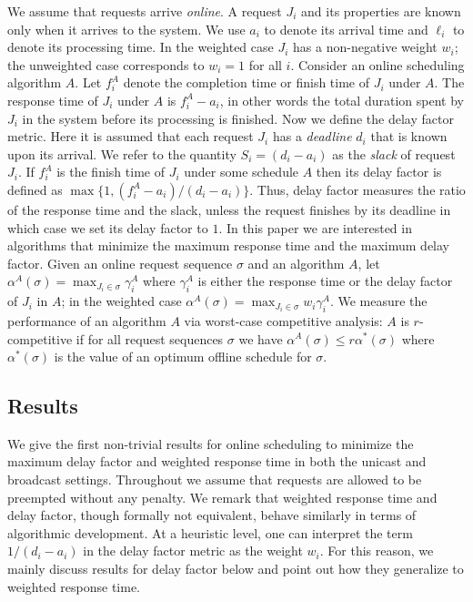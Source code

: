 We assume that requests arrive \emph{online}. A request $J_i$ and its
properties are known only when it arrives to the system.  We use
$a_i$ to denote its arrival time and $\ell_i$ to denote its
processing time. In the weighted case $J_i$ has a non-negative
weight $w_i$; the unweighted case corresponds to $w_i=1$ for all
$i$. Consider an online scheduling algorithm $A$. Let $f^A_i$ denote
the completion time or finish time of $J_i$ under $A$.  The response
time of $J_i$ under $A$ is $f^A_i - a_i$, in other words the total
duration spent by $J_i$ in the system before its processing is
finished. Now we define the delay factor metric. Here it is
assumed that each request $J_i$ has a \emph{deadline} $d_i$ that is
known upon its arrival. We refer to the quantity $S_i = (d_i-a_i)$
as the \emph{slack} of request $J_i$. If $f^A_i$ is the finish time
of $J_i$ under some schedule $A$ then its delay factor is defined as
$\max \{ 1, {(f^A_i - a_i)}/{(d_i - a_i)}\}$. Thus, delay factor
measures the ratio of the response time and the slack, unless the
request finishes by its deadline in which case we set its delay
factor to $1$.  In this paper we are interested in algorithms that
minimize the maximum response time and the maximum delay factor.
Given an online request sequence $\sigma$ and an algorithm $A$, let
$\alpha^A(\sigma) = \max_{J_i \in \sigma} \gamma^A_i$ where
$\gamma^A_i$ is either the response time or the delay factor of
$J_i$ in $A$; in the weighted case $\alpha^A(\sigma) = \max_{J_i \in
\sigma} w_i \gamma^A_i$.  We measure the performance of an algorithm
$A$ via worst-case competitive analysis: $A$ is $r$-competitive if
for all request sequences $\sigma$ we have $\alpha^A(\sigma) \le r
\alpha^*(\sigma)$ where $\alpha^*(\sigma)$ is the value of an
optimum offline schedule for $\sigma$.

\subsection{Results}
We give the first non-trivial results for online scheduling to minimize the
maximum delay factor and weighted response time in both the unicast
and broadcast settings. Throughout we assume that requests are
allowed to be preempted without any penalty.  We remark that
weighted response time and delay factor, though formally not
equivalent, behave similarly in terms of algorithmic development. At
a heuristic level, one can interpret the term ${1}/{(d_i-a_i)}$ in
the delay factor metric as the weight $w_i$. For this reason, we
mainly discuss results for delay factor below and point out how they
generalize to weighted response time.

